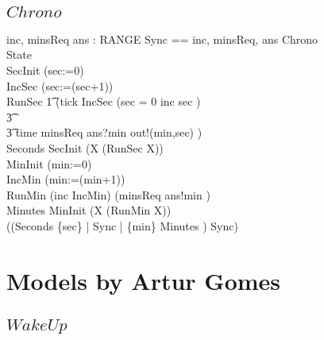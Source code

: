 \subsection{$Chrono$}
\begin{circus}
\circchannel inc, minsReq
\also \circchannel ans : RANGE
\also \circchannelset Sync == \lchanset inc, minsReq, ans \rchanset
\also \circprocess Chrono \circdef\ \circbegin\\
\circstate State \\
SecInit \circdef (sec:=0)\\
IncSec \circdef (sec:=(sec+1))\\
RunSec \circdef \t1
(tick \then IncSec \circseq
    (\circif  sec = 0 \circthen inc \then \Skip
    \circelse sec  \circthen \Skip \circfi)
  \\\t3 \extchoice\\
  \t3  time \then minsReq \then ans?min \then out!(min,sec)
      \then \Skip )  \\
Seconds \circdef SecInit \circseq (\circmu X \circspot (RunSec \circseq X))\\
MinInit \circdef (min:=0)\\
IncMin \circdef (min:=(min+1))\\
RunMin \circdef (inc \then IncMin) \extchoice (minsReq \then ans!min \then \Skip)\\
Minutes \circdef MinInit \circseq (\circmu X \circspot (RunMin \circseq X))\\
\circspot ((Seconds \lpar \{sec\} | Sync | \{min\} \rpar Minutes ) \circhide Sync)\\
\circend
\end{circus}

\section{Models by Artur Gomes}

\subsection{$WakeUp$}


